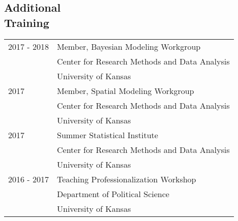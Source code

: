 \documentclass[margin,line,pifont,palatino,courier]{res}
\begin{document}
\begin{resume}
\section{\sc Additional\\ Training}

\begin{tabular}{@{}p{0.8in}p{4in}}
  2017 - 2018   & Member, Bayesian Modeling Workgroup\\
            & Center for Research Methods and Data Analysis\\
            & University of Kansas\\
  2017      & Member, Spatial Modeling Workgroup\\
            & Center for Research Methods and Data Analysis\\
            & University of Kansas\\
  2017      & Summer Statistical Institute\\
            & Center for Research Methods and Data Analysis\\
                & University of Kansas\\
  2016 - 2017  & Teaching Professionalization Workshop\\
            & Department of Political Science\\
            & University of Kansas\\
\end{tabular}







\end{resume}
\end{document}
